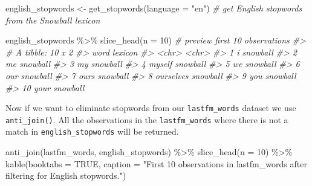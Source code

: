 \documentclass[
]{article}
\newenvironment{Shaded}{\begin{snugshade}}{\end{snugshade}}
\newcommand{\AttributeTok}[1]{\textcolor[rgb]{0.77,0.63,0.00}{#1}}
\newcommand{\CommentTok}[1]{\textcolor[rgb]{0.56,0.35,0.01}{\textit{#1}}}
\newcommand{\ConstantTok}[1]{\textcolor[rgb]{0.00,0.00,0.00}{#1}}
\newcommand{\DecValTok}[1]{\textcolor[rgb]{0.00,0.00,0.81}{#1}}
\newcommand{\FunctionTok}[1]{\textcolor[rgb]{0.00,0.00,0.00}{#1}}
\newcommand{\NormalTok}[1]{#1}
\newcommand{\OtherTok}[1]{\textcolor[rgb]{0.56,0.35,0.01}{#1}}
\newcommand{\SpecialCharTok}[1]{\textcolor[rgb]{0.00,0.00,0.00}{#1}}
\newcommand{\StringTok}[1]{\textcolor[rgb]{0.31,0.60,0.02}{#1}}
\begin{document}
\begin{Shaded}
\begin{Highlighting}[]
\NormalTok{english\_stopwords }\OtherTok{\textless{}{-}} \FunctionTok{get\_stopwords}\NormalTok{(}\AttributeTok{language =} \StringTok{"en"}\NormalTok{)  }\CommentTok{\# get English stopwords from the Snowball lexicon}

\NormalTok{english\_stopwords }\SpecialCharTok{\%\textgreater{}\%}
    \FunctionTok{slice\_head}\NormalTok{(}\AttributeTok{n =} \DecValTok{10}\NormalTok{)  }\CommentTok{\# preview first 10 observations}
\CommentTok{\#\textgreater{} \# A tibble: 10 x 2}
\CommentTok{\#\textgreater{}    word      lexicon }
\CommentTok{\#\textgreater{}    \textless{}chr\textgreater{}     \textless{}chr\textgreater{}   }
\CommentTok{\#\textgreater{}  1 i         snowball}
\CommentTok{\#\textgreater{}  2 me        snowball}
\CommentTok{\#\textgreater{}  3 my        snowball}
\CommentTok{\#\textgreater{}  4 myself    snowball}
\CommentTok{\#\textgreater{}  5 we        snowball}
\CommentTok{\#\textgreater{}  6 our       snowball}
\CommentTok{\#\textgreater{}  7 ours      snowball}
\CommentTok{\#\textgreater{}  8 ourselves snowball}
\CommentTok{\#\textgreater{}  9 you       snowball}
\CommentTok{\#\textgreater{} 10 your      snowball}
\end{Highlighting}
\end{Shaded}

Now if we want to eliminate stopwords from our \texttt{lastfm\_words} dataset we use \texttt{anti\_join()}. All the observations in the \texttt{lastfm\_words} where there is not a match in \texttt{english\_stopwords} will be returned.

\begin{Shaded}
\begin{Highlighting}[]
\FunctionTok{anti\_join}\NormalTok{(lastfm\_words, english\_stopwords) }\SpecialCharTok{\%\textgreater{}\%}
    \FunctionTok{slice\_head}\NormalTok{(}\AttributeTok{n =} \DecValTok{10}\NormalTok{) }\SpecialCharTok{\%\textgreater{}\%}
    \FunctionTok{kable}\NormalTok{(}\AttributeTok{booktabs =} \ConstantTok{TRUE}\NormalTok{, }\AttributeTok{caption =} \StringTok{"First 10 observations in \textasciigrave{}lastfm\_words\textasciigrave{} after filtering for English stopwords."}\NormalTok{)}
\end{Highlighting}
\end{Shaded}
\end{document}
